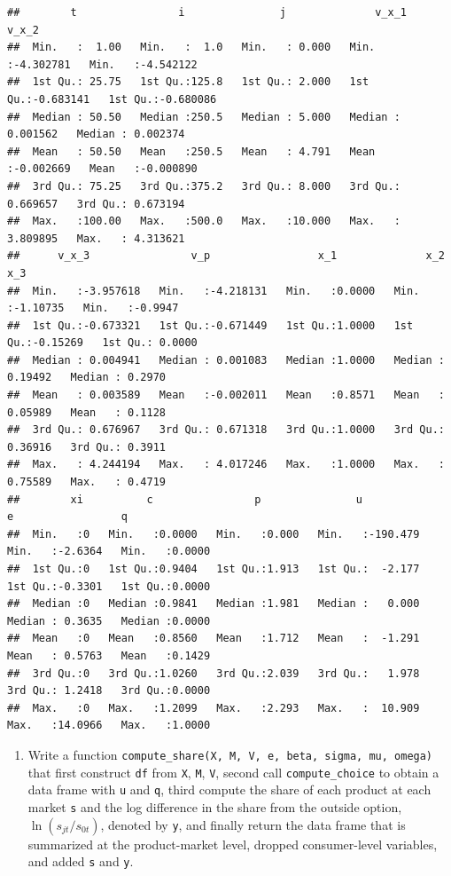 \documentclass[
]{book}
\providecommand{\tightlist}{%
  \setlength{\itemsep}{0pt}\setlength{\parskip}{0pt}}
\begin{document}
\begin{verbatim}
##        t                i               j              v_x_1               v_x_2          
##  Min.   :  1.00   Min.   :  1.0   Min.   : 0.000   Min.   :-4.302781   Min.   :-4.542122  
##  1st Qu.: 25.75   1st Qu.:125.8   1st Qu.: 2.000   1st Qu.:-0.683141   1st Qu.:-0.680086  
##  Median : 50.50   Median :250.5   Median : 5.000   Median : 0.001562   Median : 0.002374  
##  Mean   : 50.50   Mean   :250.5   Mean   : 4.791   Mean   :-0.002669   Mean   :-0.000890  
##  3rd Qu.: 75.25   3rd Qu.:375.2   3rd Qu.: 8.000   3rd Qu.: 0.669657   3rd Qu.: 0.673194  
##  Max.   :100.00   Max.   :500.0   Max.   :10.000   Max.   : 3.809895   Max.   : 4.313621  
##      v_x_3                v_p                 x_1              x_2                x_3         
##  Min.   :-3.957618   Min.   :-4.218131   Min.   :0.0000   Min.   :-1.10735   Min.   :-0.9947  
##  1st Qu.:-0.673321   1st Qu.:-0.671449   1st Qu.:1.0000   1st Qu.:-0.15269   1st Qu.: 0.0000  
##  Median : 0.004941   Median : 0.001083   Median :1.0000   Median : 0.19492   Median : 0.2970  
##  Mean   : 0.003589   Mean   :-0.002011   Mean   :0.8571   Mean   : 0.05989   Mean   : 0.1128  
##  3rd Qu.: 0.676967   3rd Qu.: 0.671318   3rd Qu.:1.0000   3rd Qu.: 0.36916   3rd Qu.: 0.3911  
##  Max.   : 4.244194   Max.   : 4.017246   Max.   :1.0000   Max.   : 0.75589   Max.   : 0.4719  
##        xi          c                p               u                  e                 q         
##  Min.   :0   Min.   :0.0000   Min.   :0.000   Min.   :-190.479   Min.   :-2.6364   Min.   :0.0000  
##  1st Qu.:0   1st Qu.:0.9404   1st Qu.:1.913   1st Qu.:  -2.177   1st Qu.:-0.3301   1st Qu.:0.0000  
##  Median :0   Median :0.9841   Median :1.981   Median :   0.000   Median : 0.3635   Median :0.0000  
##  Mean   :0   Mean   :0.8560   Mean   :1.712   Mean   :  -1.291   Mean   : 0.5763   Mean   :0.1429  
##  3rd Qu.:0   3rd Qu.:1.0260   3rd Qu.:2.039   3rd Qu.:   1.978   3rd Qu.: 1.2418   3rd Qu.:0.0000  
##  Max.   :0   Max.   :1.2099   Max.   :2.293   Max.   :  10.909   Max.   :14.0966   Max.   :1.0000
\end{verbatim}

\begin{enumerate}
\def\labelenumi{\arabic{enumi}.}
\setcounter{enumi}{8}
\tightlist
\item
  Write a function \texttt{compute\_share(X,\ M,\ V,\ e,\ beta,\ sigma,\ mu,\ omega)} that first construct \texttt{df} from \texttt{X}, \texttt{M}, \texttt{V}, second call \texttt{compute\_choice} to obtain a data frame with \texttt{u} and \texttt{q}, third compute the share of each product at each market \texttt{s} and the log difference in the share from the outside option, \(\ln(s_{jt}/s_{0t})\), denoted by \texttt{y}, and finally return the data frame that is summarized at the product-market level, dropped consumer-level variables, and added \texttt{s} and \texttt{y}.
\end{enumerate}
\end{document}
